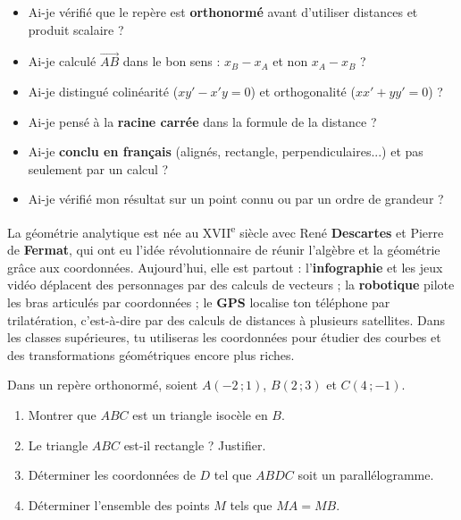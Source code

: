\documentclass[11pt]{article}
\begin{document}
\begin{attention}
\begin{itemize}
\item[$\square$] Ai-je vérifié que le repère est \textbf{orthonormé} avant d'utiliser distances et produit scalaire ?
\item[$\square$] Ai-je calculé $\overrightarrow{AB}$ dans le bon sens : $x_B - x_A$ et non $x_A - x_B$ ?
\item[$\square$] Ai-je distingué colinéarité ($xy' - x'y = 0$) et orthogonalité ($xx' + yy' = 0$) ?
\item[$\square$] Ai-je pensé à la \textbf{racine carrée} dans la formule de la distance ?
\item[$\square$] Ai-je \textbf{conclu en français} (alignés, rectangle, perpendiculaires...) et pas seulement par un calcul ?
\item[$\square$] Ai-je vérifié mon résultat sur un point connu ou par un ordre de grandeur ?
\end{itemize}
\end{attention}

\begin{savaistu}
La géométrie analytique est née au XVII\textsuperscript{e} siècle avec René \textbf{Descartes} et Pierre de \textbf{Fermat}, qui ont eu l'idée révolutionnaire de réunir l'algèbre et la géométrie grâce aux coordonnées. Aujourd'hui, elle est partout : l'\textbf{infographie} et les jeux vidéo déplacent des personnages par des calculs de vecteurs ; la \textbf{robotique} pilote les bras articulés par coordonnées ; le \textbf{GPS} localise ton téléphone par trilatération, c'est-à-dire par des calculs de distances à plusieurs satellites. Dans les classes supérieures, tu utiliseras les coordonnées pour étudier des courbes et des transformations géométriques encore plus riches.
\end{savaistu}

\begin{exercice}
Dans un repère orthonormé, soient $A(-2\,;1)$, $B(2\,;3)$ et $C(4\,;-1)$.
\begin{enumerate}
\item Montrer que $ABC$ est un triangle isocèle en $B$.
\item Le triangle $ABC$ est-il rectangle ? Justifier.
\item Déterminer les coordonnées de $D$ tel que $ABDC$ soit un parallélogramme.
\item Déterminer l'ensemble des points $M$ tels que $MA = MB$.
\end{enumerate}
\end{exercice}
\end{document}

